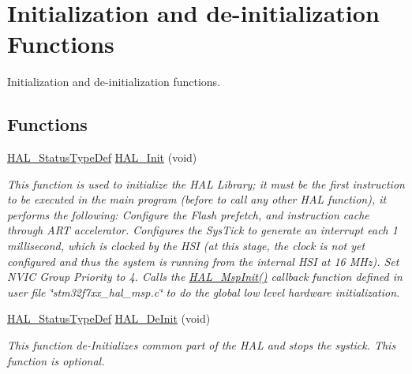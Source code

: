 \hypertarget{group___h_a_l___exported___functions___group1}{}\section{Initialization and de-\/initialization Functions}
\label{group___h_a_l___exported___functions___group1}


Initialization and de-\/initialization functions.  


\subsection*{Functions}
\begin{DoxyCompactItemize}
\item 
\mbox{\hyperlink{stm32f7xx__hal__def_8h_a63c0679d1cb8b8c684fbb0632743478f}{H\+A\+L\+\_\+\+Status\+Type\+Def}} \mbox{\hyperlink{group___h_a_l___exported___functions___group1_gaecac54d350c3730e6831eb404e557dc4}{H\+A\+L\+\_\+\+Init}} (void)
\begin{DoxyCompactList}\small\item\em This function is used to initialize the H\+AL Library; it must be the first instruction to be executed in the main program (before to call any other H\+AL function), it performs the following\+: Configure the Flash prefetch, and instruction cache through A\+RT accelerator. Configures the Sys\+Tick to generate an interrupt each 1 millisecond, which is clocked by the H\+SI (at this stage, the clock is not yet configured and thus the system is running from the internal H\+SI at 16 M\+Hz). Set N\+V\+IC Group Priority to 4. Calls the \mbox{\hyperlink{group___h_a_l___exported___functions___group1_ga07e099a69ab23e79be8b7a80505de519}{H\+A\+L\+\_\+\+Msp\+Init()}} callback function defined in user file \char`\"{}stm32f7xx\+\_\+hal\+\_\+msp.\+c\char`\"{} to do the global low level hardware initialization. \end{DoxyCompactList}\item 
\mbox{\hyperlink{stm32f7xx__hal__def_8h_a63c0679d1cb8b8c684fbb0632743478f}{H\+A\+L\+\_\+\+Status\+Type\+Def}} \mbox{\hyperlink{group___h_a_l___exported___functions___group1_ga95911129a26afb05232caaaefa31956f}{H\+A\+L\+\_\+\+De\+Init}} (void)
\begin{DoxyCompactList}\small\item\em This function de-\/\+Initializes common part of the H\+AL and stops the systick. This function is optional. \end{DoxyCompactList}\item 

\end{DoxyCompactItemize}
